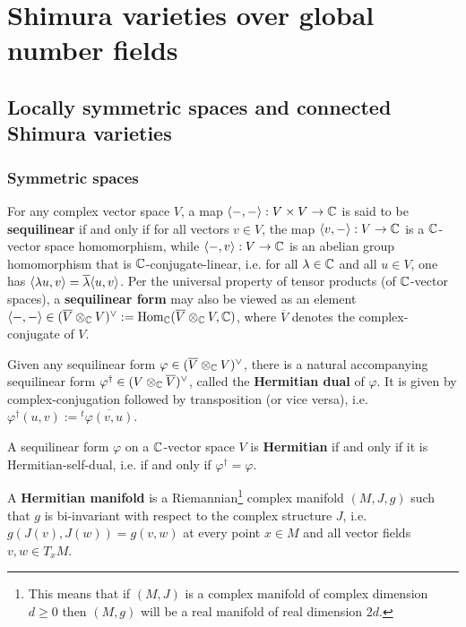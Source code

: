 \section{Shimura varieties over global number fields}
    \subsection{Locally symmetric spaces and connected Shimura varieties}
        \subsubsection{Symmetric spaces}
            \begin{definition} \label{def: sequilinear_forms}
                For any complex vector space $V$, a map $\<-,-\>: V \x V \to \bbC$ is said to be \textbf{sequilinear} if and only if for all vectors $v \in V$, the map $\langle v, -\rangle: V \to \mathbb{C}$ is a $\mathbb{C}$-vector space homomorphism, while $\langle-, v\rangle: V \to \mathbb{C}$ is an abelian group homomorphism that is $\mathbb{C}$-conjugate-linear, i.e. for all $\lambda \in \mathbb{C}$ and all $u \in V$, one has $\langle\lambda u, v\rangle = \overline{\lambda} \langle u, v\rangle$. Per the universal property of tensor products (of $\mathbb{C}$-vector spaces), a \textbf{sequilinear form} may also be viewed as an element $\<-,-\> \in (\overline{V} \tensor_{\bbC} V)^{\vee} := \Hom_{\bbC}(\overline{V} \tensor_{\bbC} V, \bbC)$, where $\overline{V}$ denotes the complex-conjugate of $V$.
            \end{definition}
            \begin{remark}
                Given any sequilinear form $\varphi \in (\overline{V} \tensor_{\bbC} V)^{\vee}$, there is a natural accompanying sequilinear form $\varphi^{\dagger} \in (V \tensor_{\bbC} \overline{V})^{\vee}$, called the \textbf{Hermitian dual} of $\varphi$. It is given by complex-conjugation followed by transposition (or vice versa), i.e. $\varphi^{\dagger}(u, v) := {}^t\overline{\varphi(v, u)}$.
            \end{remark}
            \begin{definition} \label{def: hermitian_forms}
                A sequilinear form $\varphi$ on a $\mathbb{C}$-vector space $V$ is \textbf{Hermitian} if and only if it is Hermitian-self-dual, i.e. if and only if $\varphi^{\dagger} = \varphi$.
            \end{definition}
            \begin{definition} \label{def: hermitian_manifolds}
                A \textbf{Hermitian manifold} is a Riemannian\footnote{This means that if $(M, J)$ is a complex manifold of complex dimension $d \geq 0$ then $(M, g)$ will be a real manifold of real dimension $2d$.} complex manifold $(M, J, g)$ such that $g$ is bi-invariant with respect to the complex structure $J$, i.e. $g(J(v), J(w)) = g(v, w)$ at every point $x \in M$ and all vector fields $v, w \in T_xM$.
            \end{definition}
